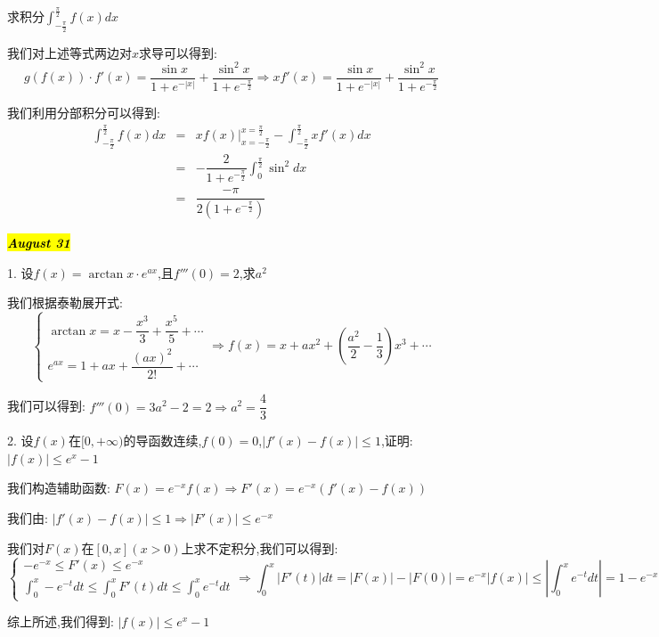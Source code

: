 求积分$\int_{-\frac{\pi}{2}}^{\frac{\pi}{2}}f(x)dx$
\begin{solution}

	我们对上述等式两边对$x$求导可以得到:  
	$$g(f(x))\cdot f'(x)=\dfrac{\sin x}{1+e^{-|x|}}+\dfrac{\sin^2 x}{1+e^{-\frac{\pi}{2}}}\Rightarrow xf'(x)=\dfrac{\sin x}{1+e^{-|x|}}+\dfrac{\sin^2 x}{1+e^{-\frac{\pi}{2}}}$$
	
	我们利用分部积分可以得到:  
	\begin{eqnarray*}
		\int_{-\frac{\pi}{2}}^{\frac{\pi}{2}}f(x)dx&=&xf(x)|_{x=-\frac{\pi}{2}}^{x=\frac{\pi}{2}}-\int_{-\frac{\pi}{2}}^{\frac{\pi}{2}}xf'(x)dx\\
		&=&-\dfrac{2}{1+e^{-\frac{\pi}{2}}}\int_{0}^{\frac{\pi}{2}}\sin^2 dx\\
		&=&\dfrac{-\pi}{2(1+e^{-\frac{\pi}{2}})}
	\end{eqnarray*}
\end{solution}

\hl{\textbf{\textit{August 31}}}

1. 设$f(x)=\arctan x \cdot e^{ax}$,且$f'''(0)=2$,求$a^2$
\begin{solution}

	我们根据泰勒展开式:  
	$$\left\lbrace
	\begin{array}{l}
		\arctan x=x-\dfrac{x^3}{3}+\dfrac{x^5}{5}+\cdots\\
		e^{ax}=1+ax+\dfrac{(ax)^2}{2!}+\cdots
	\end{array}
	\right. \Rightarrow f(x)=x+ax^2+(\dfrac{a^2}{2}-\dfrac{1}{3})x^3+\cdots$$
	
	我们可以得到:  $f'''(0)=3a^2-2=2\Rightarrow a^2=\dfrac{4}{3}$
\end{solution}

2. 设$f(x)$在$[0,+\infty)$的导函数连续,$f(0)=0$,$|f'(x)-f(x)|\leq 1$,证明:  $|f(x)|\leq e^x-1$
\begin{solution}

	我们构造辅助函数:  $F(x)=e^{-x}f(x)\Rightarrow F'(x)=e^{-x}(f'(x)-f(x))$
	
	我们由:  $|f'(x)-f(x)|\leq 1\Rightarrow |F'(x)|\leq e^{-x}$
	
	我们对$F(x)$在$[0,x](x>0)$上求不定积分,我们可以得到:  
	$$\left\lbrace
	\begin{array}{l}
		-e^{-x}\leq F'(x)\leq e^{-x}\\
		\int_{0}^{x}-e^{-t}dt\leq\int_{0}^{x}F'(t)dt \leq \int_{0}^{x}e^{-t}dt
	\end{array}
	\right. \Rightarrow\int_{0}^{x}|F'(t)|dt=|F(x)|-|F(0)|=e^{-x}|f(x)|\leq | \int_{0}^{x}e^{-t}dt|=1-e^{-x}$$
	
	综上所述,我们得到:  $|f(x)|\leq e^x-1$
\end{solution}

